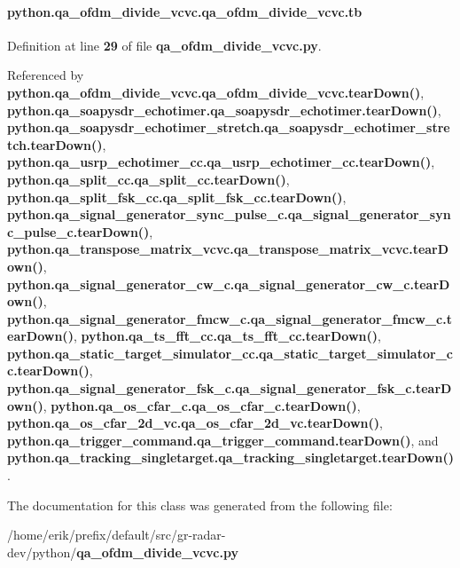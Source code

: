 \paragraph[{tb}]{\setlength{\rightskip}{0pt plus 5cm}python.\+qa\+\_\+ofdm\+\_\+divide\+\_\+vcvc.\+qa\+\_\+ofdm\+\_\+divide\+\_\+vcvc.\+tb}\label{classpython_1_1qa__ofdm__divide__vcvc_1_1qa__ofdm__divide__vcvc_a10fd33cda8709f5e5ac4ad68c38bd74a}


Definition at line {\bf 29} of file {\bf qa\+\_\+ofdm\+\_\+divide\+\_\+vcvc.\+py}.



Referenced by {\bf python.\+qa\+\_\+ofdm\+\_\+divide\+\_\+vcvc.\+qa\+\_\+ofdm\+\_\+divide\+\_\+vcvc.\+tear\+Down()}, {\bf python.\+qa\+\_\+soapysdr\+\_\+echotimer.\+qa\+\_\+soapysdr\+\_\+echotimer.\+tear\+Down()}, {\bf python.\+qa\+\_\+soapysdr\+\_\+echotimer\+\_\+stretch.\+qa\+\_\+soapysdr\+\_\+echotimer\+\_\+stretch.\+tear\+Down()}, {\bf python.\+qa\+\_\+usrp\+\_\+echotimer\+\_\+cc.\+qa\+\_\+usrp\+\_\+echotimer\+\_\+cc.\+tear\+Down()}, {\bf python.\+qa\+\_\+split\+\_\+cc.\+qa\+\_\+split\+\_\+cc.\+tear\+Down()}, {\bf python.\+qa\+\_\+split\+\_\+fsk\+\_\+cc.\+qa\+\_\+split\+\_\+fsk\+\_\+cc.\+tear\+Down()}, {\bf python.\+qa\+\_\+signal\+\_\+generator\+\_\+sync\+\_\+pulse\+\_\+c.\+qa\+\_\+signal\+\_\+generator\+\_\+sync\+\_\+pulse\+\_\+c.\+tear\+Down()}, {\bf python.\+qa\+\_\+transpose\+\_\+matrix\+\_\+vcvc.\+qa\+\_\+transpose\+\_\+matrix\+\_\+vcvc.\+tear\+Down()}, {\bf python.\+qa\+\_\+signal\+\_\+generator\+\_\+cw\+\_\+c.\+qa\+\_\+signal\+\_\+generator\+\_\+cw\+\_\+c.\+tear\+Down()}, {\bf python.\+qa\+\_\+signal\+\_\+generator\+\_\+fmcw\+\_\+c.\+qa\+\_\+signal\+\_\+generator\+\_\+fmcw\+\_\+c.\+tear\+Down()}, {\bf python.\+qa\+\_\+ts\+\_\+fft\+\_\+cc.\+qa\+\_\+ts\+\_\+fft\+\_\+cc.\+tear\+Down()}, {\bf python.\+qa\+\_\+static\+\_\+target\+\_\+simulator\+\_\+cc.\+qa\+\_\+static\+\_\+target\+\_\+simulator\+\_\+cc.\+tear\+Down()}, {\bf python.\+qa\+\_\+signal\+\_\+generator\+\_\+fsk\+\_\+c.\+qa\+\_\+signal\+\_\+generator\+\_\+fsk\+\_\+c.\+tear\+Down()}, {\bf python.\+qa\+\_\+os\+\_\+cfar\+\_\+c.\+qa\+\_\+os\+\_\+cfar\+\_\+c.\+tear\+Down()}, {\bf python.\+qa\+\_\+os\+\_\+cfar\+\_\+2d\+\_\+vc.\+qa\+\_\+os\+\_\+cfar\+\_\+2d\+\_\+vc.\+tear\+Down()}, {\bf python.\+qa\+\_\+trigger\+\_\+command.\+qa\+\_\+trigger\+\_\+command.\+tear\+Down()}, and {\bf python.\+qa\+\_\+tracking\+\_\+singletarget.\+qa\+\_\+tracking\+\_\+singletarget.\+tear\+Down()}.



The documentation for this class was generated from the following file\+:\begin{DoxyCompactItemize}
\item 
/home/erik/prefix/default/src/gr-\/radar-\/dev/python/{\bf qa\+\_\+ofdm\+\_\+divide\+\_\+vcvc.\+py}\end{DoxyCompactItemize}
